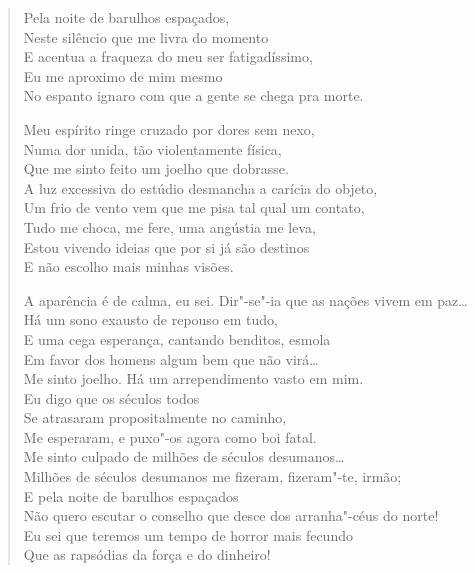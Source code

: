 \begin{verse}
Pela noite de barulhos espaçados,\\
Neste silêncio que me livra do momento\\
E acentua a fraqueza do meu ser fatigadíssimo,\\
Eu me aproximo de mim mesmo\\
No espanto ignaro com que a gente se chega pra morte.

Meu espírito ringe cruzado por dores sem nexo,\\
Numa dor unida, tão violentamente física,\\
Que me sinto feito um joelho que dobrasse.\\
A luz excessiva do estúdio desmancha a carícia do objeto,\\
Um frio de vento vem que me pisa tal qual um contato,\\
Tudo me choca, me fere, uma angústia me leva,\\
Estou vivendo ideias que por si já são destinos\\
E não escolho mais minhas visões.

A aparência é de calma, eu sei. Dir"-se"-ia que as nações vivem em paz\ldots{}\\
Há um sono exausto de repouso em tudo,\\
E uma cega esperança, cantando benditos, esmola\\
Em favor dos homens algum bem que não virá\ldots{}\\
Me sinto joelho. Há um arrependimento vasto em mim.\\
Eu digo que os séculos todos\\
Se atrasaram propositalmente no caminho,\\
Me esperaram, e puxo"-os agora como boi fatal.\\
Me sinto culpado de milhões de séculos desumanos\ldots{}\\
Milhões de séculos desumanos me fizeram, fizeram"-te, irmão;\\
E pela noite de barulhos espaçados\\
Não quero escutar o conselho que desce dos arranha"-céus do norte!\\
Eu sei que teremos um tempo de horror mais fecundo\\
Que as rapsódias da força e do dinheiro!


\end{verse}

